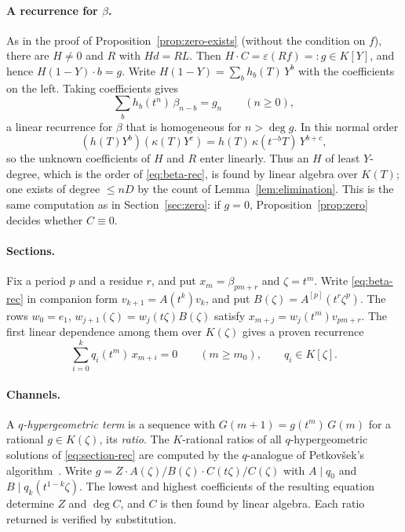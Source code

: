 \documentclass[11pt,a4paper]{article}
\newcommand{\eps}{\varepsilon}
\theoremstyle{plain}
\theoremstyle{definition}
\theoremstyle{remark}
\begin{document}
\paragraph{A recurrence for $\beta$.} As in the proof of
Proposition~\ref{prop:zero-exists} (without the condition on $f$), there are
$H\ne0$ and $R$ with $Hd=RL$. Then $H\cdot C=\eps(Rf)=:g\in K[Y]$, and hence
$H(1-Y)\cdot b=g$. Write $H(1-Y)=\sum_bh_b(T)\,Y^b$ with the coefficients on
the left. Taking coefficients gives
\begin{equation}\label{eq:beta-rec}
  \sum_b h_b(t^n)\,\beta_{n-b}=g_n\qquad(n\ge0),
\end{equation}
a linear recurrence for $\beta$ that is homogeneous for $n>\deg g$. In this
normal order
\[
  (h(T)Y^b)(\kappa(T)Y^c)=h(T)\,\kappa(t^{-b}T)\,Y^{b+c},
\]
so the unknown coefficients of $H$ and $R$ enter linearly. Thus an $H$ of least
$Y$-degree, which is the order of \eqref{eq:beta-rec}, is found by linear
algebra over $K(T)$; one exists of degree $\le nD$ by the count of
Lemma~\ref{lem:elimination}. This is the same computation as in
Section~\ref{sec:zero}: if $g=0$, Proposition~\ref{prop:zero} decides whether
$C\equiv0$.

\paragraph{Sections.} Fix a period $p$ and a residue $r$, and put
$x_m=\beta_{pm+r}$ and $\zeta=t^m$. Write \eqref{eq:beta-rec} in companion form
$v_{k+1}=A(t^k)v_k$, and put $B(\zeta)=A^{[p]}(t^r\zeta^p)$. The rows
$w_0=e_1$, $w_{j+1}(\zeta)=w_j(t\zeta)B(\zeta)$ satisfy
$x_{m+j}=w_j(t^m)v_{pm+r}$. The first linear dependence among them over
$K(\zeta)$ gives a proven recurrence
\begin{equation}\label{eq:section-rec}
  \sum_{i=0}^{k}q_i(t^m)\,x_{m+i}=0\qquad(m\ge m_0),\qquad q_i\in K[\zeta].
\end{equation}

\paragraph{Channels.} A \emph{$q$-hypergeometric term} is a sequence with
$G(m+1)=g(t^m)\,G(m)$ for a rational $g\in K(\zeta)$, its \emph{ratio}. The
$K$-rational ratios of all $q$-hypergeometric solutions of
\eqref{eq:section-rec} are computed by the $q$-analogue of Petkov\v{s}ek's
algorithm~\cite{APP}. Write $g=Z\cdot A(\zeta)/B(\zeta)\cdot C(t\zeta)/C(\zeta)$
with $A\mid q_0$ and $B\mid q_k(t^{1-k}\zeta)$. The lowest and highest
coefficients of the resulting equation determine $Z$ and $\deg C$, and $C$ is
then found by linear algebra. Each ratio returned is verified by substitution.
\end{document}
